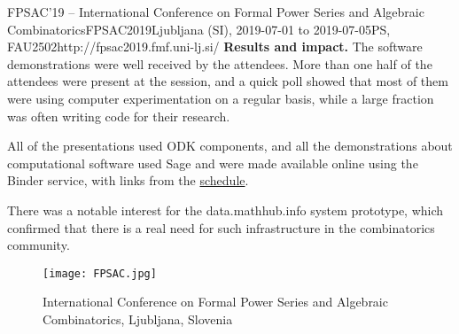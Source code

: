 \begin{event}{FPSAC'19 -- International Conference on Formal Power Series and Algebraic Combinatorics}{FPSAC2019}{Ljubljana (SI),
  2019-07-01 to
  2019-07-05}{PS, FAU}{250}{2}{http://fpsac2019.fmf.uni-lj.si/}
\textbf{Results and impact.} The software demonstrations were well
received by the attendees. More than one half of the attendees were
present at the session, and a quick poll showed that most of them were
using computer experimentation on a regular basis, while a large
fraction was often writing code for their research.

All of the presentations used ODK components, and all the
demonstrations about computational software used Sage and were made
available online using the Binder service, with links from the
\href{http://fpsac2019.fmf.uni-lj.si/schedule/}{schedule}.

There was a notable interest for the \textsf{data.math\-hub.info}
system prototype, which confirmed that there is a real need for such
infrastructure in the combinatorics community.

\begin{figure}[ht]
  \texttt{[image: FPSAC.jpg]}
  \caption*{International Conference on Formal Power Series and Algebraic Combinatorics, Ljubljana, Slovenia}
\end{figure}

\end{event}
